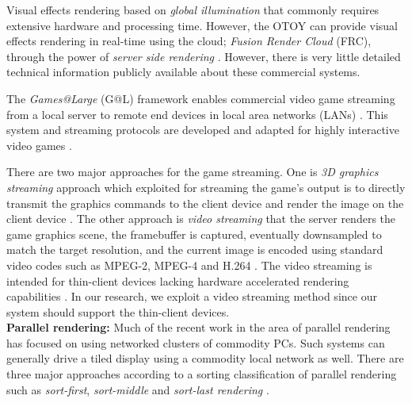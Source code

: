 \documentclass[conference]{IEEEtran}
\begin{document}
   Visual effects rendering based on \emph{global illumination} that commonly requires extensive hardware and processing time.
   However, the OTOY can provide visual effects rendering in real-time using the cloud; \emph{Fusion Render Cloud} (FRC), through the power of \emph{server side rendering} \cite{OTOY:2009}.
   However, there is very little detailed technical information publicly available about these commercial systems.

   The \emph{Games@Large} (G@L) framework enables commercial video game streaming from a local server to remote end devices in local area networks (LANs) \cite{Tzruya:2006}.
   This system and streaming protocols are developed and adapted for highly interactive video games \cite{Jurgelionis:2009} \cite{Nave:2008}.

   There are two major approaches for the game streaming.
   One is \emph{3D graphics streaming} approach which exploited for streaming the game's output is to directly transmit the graphics commands to the client device and render the image on the client device \cite{Humphreys:2002}.
   The other approach is \emph{video streaming} that the server renders the game graphics scene, the framebuffer is captured, eventually downsampled to match the target resolution, and the current image is encoded using standard video codes such as MPEG-2, MPEG-4 and H.264 \cite{Cheng:2004}\cite{Karachristos:2008}.
   The video streaming is intended for thin-client devices lacking hardware accelerated rendering capabilities \cite{Winter:2006}.
   In our research, we exploit a video streaming method since our system should support the thin-client devices.\\

    \noindent
    \textbf{Parallel rendering:}
    Much of the recent work in the area of parallel rendering has focused on using networked clusters of commodity PCs.
    Such systems can generally drive a tiled display using a commodity local network as well.
    There are three major approaches according to a sorting classification of parallel rendering such as \emph{sort-first}, \emph{sort-middle} and \emph{sort-last rendering} \cite{Molnar:2008}.
\end{document}
